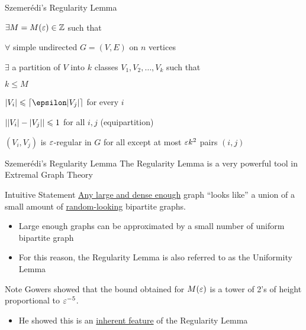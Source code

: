 \begin{frame}{Szemer\'{e}di's Regularity Lemma}
	
\begin{theorem}
\begin{description}[abc]
	\item<2->[$\bullet$] $\exists M = M(\varepsilon) \in {\mathbb Z}$ such that
	\begin{description}[abc]
		\item<3->[$\bullet$]  $\forall$ simple undirected  $G=(V,E)$ on $n$ vertices
		\begin{description}[abc]
			\item<4->[$\bullet$]  $\exists$ a partition of $V$ into $k$ classes $V_1, V_2, \dotsc, V_k$ such that
			\begin{description}[abc]
				\item<5->[$\bullet$] $k \leq M$
				\item<6->[$\bullet$] $|V_i| \leq \ceil{\epsilon |V_j|}$ for every $i$
				\item<7->[$\bullet$] $\left\vert{ |V_i| - |V_j| }\right\vert \leqslant 1$ for all $i,j$ (equipartition)
				\item<8->[$\bullet$] $(V_i, V_j)$ is $\varepsilon$-regular in $G$ for all except at most $\varepsilon k^2$ pairs $(i,j)$
			\end{description}
		\end{description}
	\end{description}
\end{description}
\end{theorem}

\end{frame}

\begin{frame}{Szemer\'{e}di's Regularity Lemma}
The Regularity Lemma is a very powerful tool in Extremal Graph Theory
 
\begin{block}{Intuitive Statement}
	\ul{Any large and dense enough} graph ``looks like'' a union of a small amount of \ul{random-looking} bipartite graphs.
\end{block}

\begin{itemize}
	\item Large enough graphs can be approximated by a small number of uniform bipartite graph
	\item For this reason, the Regularity Lemma is also referred to as the Uniformity Lemma
\end{itemize}

\begin{block}{Note}
	Gowers \cite{..} showed that the bound obtained for $M(\varepsilon)$ is a tower of 2's of height proportional to $\varepsilon^{-5}$.
	\begin{itemize}
		\item He showed this is an \ul{inherent feature} of the Regularity Lemma
	\end{itemize}
\end{block}

\end{frame}

